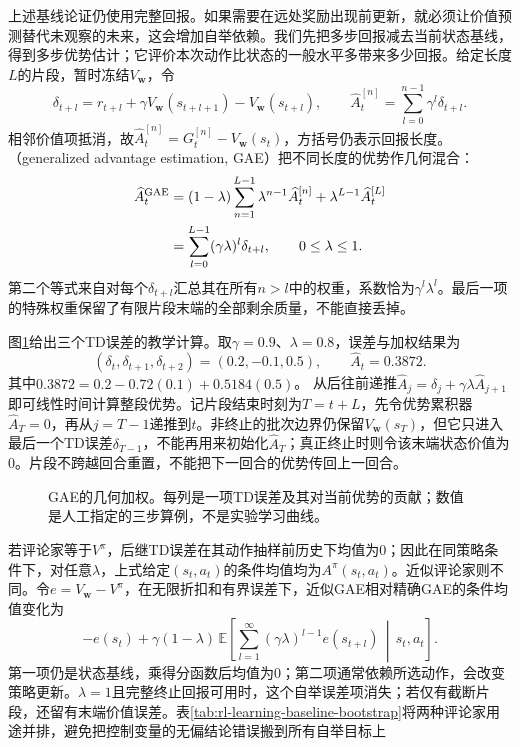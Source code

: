 上述基线论证仍使用完整回报。如果需要在远处奖励出现前更新，就必须让价值预测替代未观察的未来，这会增加自举依赖。我们先把多步回报减去当前状态基线，得到多步优势估计；它评价本次动作比状态的一般水平多带来多少回报。给定长度$L$的片段，暂时冻结$V_{\bm w}$，令
\[
  \delta_{t+l}=r_{t+l}+\gamma V_{\bm w}(s_{t+l+1})
                            -V_{\bm w}(s_{t+l}),\qquad
  \widehat A_t^{[n]}=\sum_{l=0}^{n-1}\gamma^l\delta_{t+l}.
\]
相邻价值项抵消，故$\widehat A_t^{[n]}=G_t^{[n]}-V_{\bm w}(s_t)$，方括号仍表示回报长度。（generalized advantage estimation, GAE）把不同长度的优势作几何混合：
\begin{align}
  \widehat A_t^{\mathrm{GAE}}
    &=(1-\lambda)\sum_{n=1}^{L-1}\lambda^{n-1}\widehat A_t^{[n]}
       +\lambda^{L-1}\widehat A_t^{[L]}
       \notag\\
    &=\sum_{l=0}^{L-1}(\gamma\lambda)^l\delta_{t+l},
       \qquad 0\leq\lambda\leq1.
    \label{eq:rl-learning-gae}
\end{align}
第二个等式来自对每个$\delta_{t+l}$汇总其在所有$n>l$中的权重，系数恰为$\gamma^l\lambda^l$。最后一项的特殊权重保留了有限片段末端的全部剩余质量，不能直接丢掉。

图\ref{fig:rl-learning-gae}给出三个TD误差的教学计算。取$\gamma=0.9$、$\lambda=0.8$，误差与加权结果为
\[
  (\delta_t,\delta_{t+1},\delta_{t+2})=(0.2,-0.1,0.5),\qquad
  \widehat A_t=0.3872.
\]
其中$0.3872=0.2-0.72(0.1)+0.5184(0.5)$。
从后往前递推$\widehat A_j=\delta_j+\gamma\lambda\widehat A_{j+1}$即可线性时间计算整段优势。记片段结束时刻为$T=t+L$，先令优势累积器$\widehat A_T=0$，再从$j=T-1$递推到$t$。非终止的批次边界仍保留$V_{\bm w}(s_T)$，但它只进入最后一个TD误差$\delta_{T-1}$，不能再用来初始化$\widehat A_T$；真正终止时则令该末端状态价值为0。片段不跨越回合重置，不能把下一回合的优势传回上一回合。

\begin{figure}[htbp]
  \centering
  
  \caption{GAE的几何加权。每列是一项TD误差及其对当前优势的贡献；数值是人工指定的三步算例，不是实验学习曲线。}
  \label{fig:rl-learning-gae}
\end{figure}

若评论家等于$V^\pi$，后继TD误差在其动作抽样前历史下均值为0；因此在同策略条件下，对任意$\lambda$，上式给定$(s_t,a_t)$的条件均值均为$A^\pi(s_t,a_t)$。近似评论家则不同。令$e=V_{\bm w}-V^\pi$，在无限折扣和有界误差下，近似GAE相对精确GAE的条件均值变化为
\[
  -e(s_t)+
  \gamma(1-\lambda)\,
  \mathbb E\left[
     \sum_{l=1}^{\infty}(\gamma\lambda)^{l-1}e(s_{t+l})
        \,\middle|\,s_t,a_t\right].
\]
第一项仍是状态基线，乘得分函数后均值为0；第二项通常依赖所选动作，会改变策略更新。$\lambda=1$且完整终止回报可用时，这个自举误差项消失；若仅有截断片段，还留有末端价值误差。表\ref{tab:rl-learning-baseline-bootstrap}将两种评论家用途并排，避免把控制变量的无偏结论错误搬到所有自举目标上

